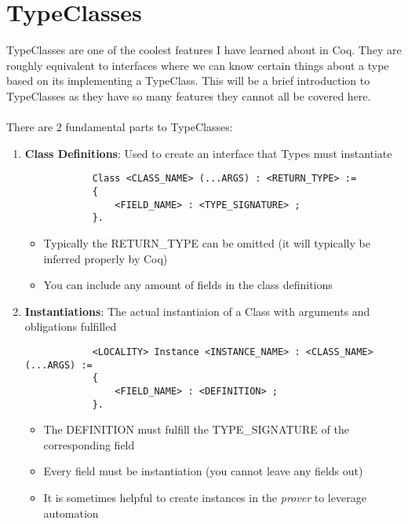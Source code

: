 \documentclass{article}
\begin{document}
    \section{TypeClasses}
    TypeClasses are one of the coolest features I have learned about in Coq. They are roughly equivalent to interfaces where we can know certain things about a type based on its implementing a TypeClass. 
    This will be a brief introduction to TypeClasses as they have so many features they cannot all be covered here.
    \\~\\
    There are 2 fundamental parts to TypeClasses:
    \begin{enumerate}
        \item \textbf{Class Definitions}: Used to create an interface that Types must instantiate
        \begin{verbatim}
            Class <CLASS_NAME> (...ARGS) : <RETURN_TYPE> := 
            {
                <FIELD_NAME> : <TYPE_SIGNATURE> ; 
            }.
        \end{verbatim} 
        
        \begin{itemize}
            \item Typically the RETURN\_TYPE can be omitted (it will typically be inferred properly by Coq)
            \item You can include any amount of fields in the class definitions
        \end{itemize} 

        \item \textbf{Instantiations}: The actual instantiaion of a Class with arguments and obligations fulfilled
        \begin{verbatim}
            <LOCALITY> Instance <INSTANCE_NAME> : <CLASS_NAME> (...ARGS) :=
            {
                <FIELD_NAME> : <DEFINITION> ;
            }.
        \end{verbatim}
        \begin{itemize}
            \item The DEFINITION must fulfill the TYPE\_SIGNATURE of the corresponding field
            \item Every field must be instantiation (you cannot leave any fields out)
            \item It is sometimes helpful to create instances in the \emph{prover} to leverage automation
        \end{itemize}
    \end{enumerate}
\end{document}
